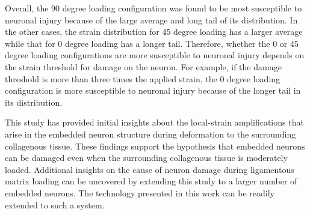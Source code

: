 \documentclass[]{interact}
\newcommand{\red}[1]{\textcolor{red}{[#1]}}
\begin{document}
Overall, the 90 degree loading configuration was found to be most susceptible to neuronal injury because of the large average and long tail of its distribution. In the other cases, the strain distribution for 45 degree loading has a larger average while that for 0 degree loading has a longer tail. Therefore, whether the 0 or 45 degree loading configurations are more susceptible to neuronal injury depends on the strain threshold for damage on the neuron. For example, if the damage threshold is more than three times the applied strain, the 0 degree loading configuration is more susceptible to neuronal injury because of the longer tail in its distribution.

This study has provided initial insights about the local-strain amplifications that arise in the embedded neuron structure during deformation to the surrounding collagenous tissue. These findings support the hypothesis that embedded neurons can be damaged even when the surrounding collagenous tissue is moderately loaded. Additional insights on the cause of neuron damage during ligamentous matrix loading can be uncovered by extending this study to a larger number of embedded neurons. The technology presented in this work can be readily extended to such a system.


%
\newpage

\end{document}
